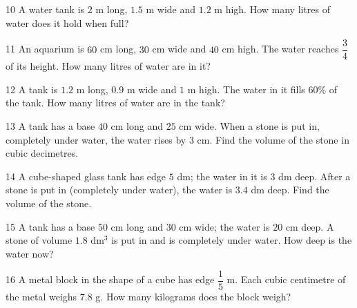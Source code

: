 \gap
\begin{probbox}{10}{\relax}
A water tank is $2$ m long, $1.5$ m wide and $1.2$ m high. How many litres of water does it hold when full?
\end{probbox}
\gap
\begin{probbox}{11}{\relax}
An aquarium is $60$ cm long, $30$ cm wide and $40$ cm high. The water reaches $\dfrac34$ of its height. How many litres of water are in it?
\end{probbox}
\gap
\begin{probbox}{12}{\relax}
A tank is $1.2$ m long, $0.9$ m wide and $1$ m high. The water in it fills $60\%$ of the tank. How many litres of water are in the tank?
\end{probbox}
\gap
\begin{probbox}{13}{\relax}
A tank has a base $40$ cm long and $25$ cm wide. When a stone is put in, completely under water, the water rises by $3$ cm. Find the volume of the stone in cubic decimetres.
\end{probbox}
\gap
\begin{probbox}{14}{\relax}
A cube-shaped glass tank has edge $5$ dm; the water in it is $3$ dm deep. After a stone is put in (completely under water), the water is $3.4$ dm deep. Find the volume of the stone.
\end{probbox}
\gap
\begin{probbox}{15}{\relax}
A tank has a base $50$ cm long and $30$ cm wide; the water is $20$ cm deep. A stone of volume $1.8$ dm$^3$ is put in and is completely under water. How deep is the water now?
\end{probbox}
\gap
\begin{probbox}{16}{\relax}
A metal block in the shape of a cube has edge $\dfrac15$ m. Each cubic centimetre of the metal weighs $7.8$ g. How many kilograms does the block weigh?
\end{probbox}
